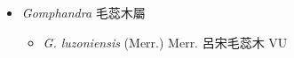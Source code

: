 
  \begin{itemize}
 \item[] \textit{Gomphandra} 毛蕊木屬
                                
  \begin{itemize}
        \item[] \textit{G. luzoniensis} (Merr.) Merr.  呂宋毛蕊木   VU
  \end{itemize}
  \end{itemize}
